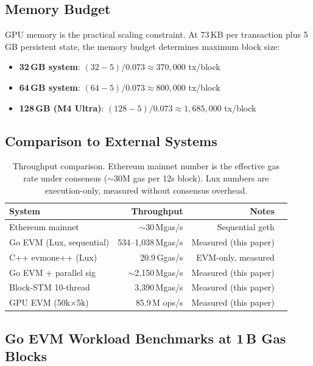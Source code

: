 \subsection{Memory Budget}

GPU memory is the practical scaling constraint. At 73\,KB per transaction plus 5\,GB
persistent state, the memory budget determines maximum block size:

\begin{itemize}
\item \textbf{32\,GB system}: $(32 - 5) / 0.073 \approx 370{,}000$ tx/block
\item \textbf{64\,GB system}: $(64 - 5) / 0.073 \approx 800{,}000$ tx/block
\item \textbf{128\,GB (M4 Ultra)}: $(128 - 5) / 0.073 \approx 1{,}685{,}000$ tx/block
\end{itemize}

\subsection{Comparison to External Systems}

\begin{table}[h]
\centering
\small
\begin{tabular}{lrrl}
\toprule
\textbf{System} & \textbf{Throughput} & \textbf{Notes} \\
\midrule
Ethereum mainnet         & $\sim$30\,Mgas/s   & Sequential geth \\
Go EVM (Lux, sequential) & 534--1{,}038\,Mgas/s & Measured (this paper) \\
C++ evmone++ (Lux)       & 20.9\,Ggas/s       & EVM-only, measured \\
Go EVM + parallel sig    & $\sim$2{,}150\,Mgas/s & Measured (this paper) \\
Block-STM 10-thread      & 3{,}390\,Mgas/s    & Measured (this paper) \\
GPU EVM (50k$\times$5k)  & 85.9\,M ops/s      & Measured (this paper) \\
\bottomrule
\end{tabular}
\caption{Throughput comparison. Ethereum mainnet number is the effective gas
rate under consensus ($\sim$30M gas per 12s block). Lux numbers are execution-only,
measured without consensus overhead.}
\label{tab:comparison}
\end{table}

\subsection{Go EVM Workload Benchmarks at 1\,B Gas Blocks}

